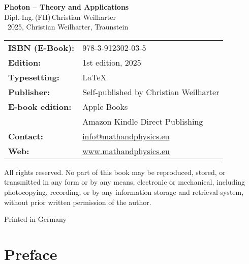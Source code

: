 \cleardoublepage
\thispagestyle{empty}
\begin{center}
	
	{\Large\textbf{Photon – Theory and Applications}}\\[1.2em]
	{\large Dipl.-Ing.\,(FH)\,Christian Weilharter}\\[1.2em]
	\textcopyright~2025, Christian Weilharter, Traunstein\\[2em]
\end{center}

\begin{flushleft}
	\begin{tabular}{@{}l l}
	
		\textbf{ISBN (E-Book):} & 978-3-912302-03-5 \\[0.5em]
		\textbf{Edition:} & 1st edition, 2025 \\[0.5em]
		\textbf{Typesetting:} & \LaTeX \\[0.5em]
		\textbf{Publisher:} & Self-published by Christian Weilharter \\[0.5em]


	
		\textbf{E-book edition:} & Apple Books \\[0.5em]
		& Amazon Kindle Direct Publishing \\[0.5em]
	
\textbf{Contact:} & \href{mailto:info@mathandphysics.eu}{info@mathandphysics.eu}\\[0.5em]
\textbf{Web:} & \href{https://www.mathandphysics.eu}{www.mathandphysics.eu}\\

	\end{tabular}
\end{flushleft}

\vspace{2em}
\noindent
All rights reserved. No part of this book may be reproduced, stored, or transmitted
in any form or by any means, electronic or mechanical, including photocopying,
recording, or by any information storage and retrieval system, without prior written
permission of the author.

\begin{center}\small Printed in Germany\end{center}

\cleardoublepage


\chapter*{Preface}



